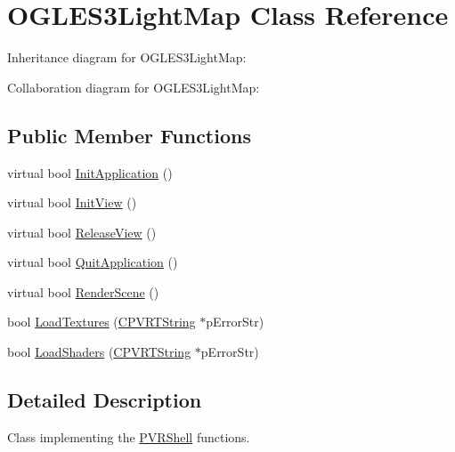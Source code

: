 \hypertarget{class_o_g_l_e_s3_light_map}{\section{O\+G\+L\+E\+S3\+Light\+Map Class Reference}
\label{class_o_g_l_e_s3_light_map}
}


Inheritance diagram for O\+G\+L\+E\+S3\+Light\+Map\+:


Collaboration diagram for O\+G\+L\+E\+S3\+Light\+Map\+:
\subsection*{Public Member Functions}
\begin{DoxyCompactItemize}
\item 
virtual bool \hyperlink{class_o_g_l_e_s3_light_map_aa18cc62bfefbba51c35b6f1596ff2b41}{Init\+Application} ()
\item 
virtual bool \hyperlink{class_o_g_l_e_s3_light_map_a2deecf7ef8c0b758d6f225f86292b7ca}{Init\+View} ()
\item 
virtual bool \hyperlink{class_o_g_l_e_s3_light_map_abaad822447b987cbf17cb89e8d035b21}{Release\+View} ()
\item 
virtual bool \hyperlink{class_o_g_l_e_s3_light_map_a3bb9aa0b93369a6a903794ebf8291016}{Quit\+Application} ()
\item 
virtual bool \hyperlink{class_o_g_l_e_s3_light_map_a3b6a2b87059eb8f336241ac9da43ec3e}{Render\+Scene} ()
\item 
bool \hyperlink{class_o_g_l_e_s3_light_map_abef22b195d86476fc4834e618827f6c8}{Load\+Textures} (\hyperlink{class_c_p_v_r_t_string}{C\+P\+V\+R\+T\+String} $\ast$p\+Error\+Str)
\item 
bool \hyperlink{class_o_g_l_e_s3_light_map_aef621ea22c0695ad6615c2aa884553de}{Load\+Shaders} (\hyperlink{class_c_p_v_r_t_string}{C\+P\+V\+R\+T\+String} $\ast$p\+Error\+Str)
\end{DoxyCompactItemize}


\subsection{Detailed Description}


 Class implementing the \hyperlink{class_p_v_r_shell}{P\+V\+R\+Shell} functions. 

